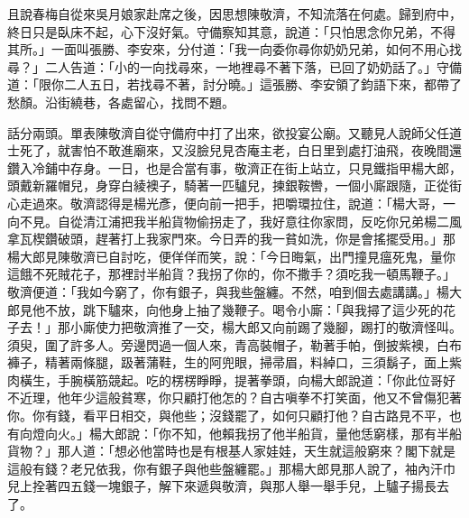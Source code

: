 且說春梅自從來吳月娘家赴席之後，因思想陳敬濟，不知流落在何處。歸到府中，終日只是臥床不起，心下沒好氣。守備察知其意，說道：「只怕思念你兄弟，不得其所。」一面叫張勝、李安來，分付道：「我一向委你尋你奶奶兄弟，如何不用心找尋？」二人告道：「小的一向找尋來，一地裡尋不著下落，已回了奶奶話了。」守備道：「限你二人五日，若找尋不著，討分曉。」這張勝、李安領了鈞語下來，都帶了愁顏。沿街繞巷，各處留心，找問不題。

話分兩頭。單表陳敬濟自從守備府中打了出來，欲投宴公廟。又聽見人說師父任道士死了，就害怕不敢進廟來，又沒臉兒見杏庵主老，白日里到處打油飛，夜晚間還鑽入冷鋪中存身。一日，也是合當有事，敬濟正在街上站立，只見鐵指甲楊大郎，頭戴新羅帽兒，身穿白綾襖子，騎著一匹驢兒，揀銀鞍轡，一個小廝跟隨，正從街心走過來。敬濟認得是楊光彥，便向前一把手，把嚼環拉住，說道：「楊大哥，一向不見。自從清江浦把我半船貨物偷拐走了，我好意往你家問，反吃你兄弟楊二風拿瓦楔鑽破頭，趕著打上我家門來。今日弄的我一貧如洗，你是會搖擺受用。」那楊大郎見陳敬濟已自討吃，便佯佯而笑，說：「今日晦氣，出門撞見瘟死鬼，量你這餓不死賊花子，那裡討半船貨？我拐了你的，你不撒手？須吃我一頓馬鞭子。」敬濟便道：「我如今窮了，你有銀子，與我些盤纏。不然，咱到個去處講講。」楊大郎見他不放，跳下驢來，向他身上抽了幾鞭子。喝令小廝：「與我撏了這少死的花子去！」那小廝使力把敬濟推了一交，楊大郎又向前踢了幾腳，踢打的敬濟怪叫。須臾，圍了許多人。旁邊閃過一個人來，青高裝帽子，勒著手帕，倒披紫襖，白布褲子，精著兩條腿，趿著蒲鞋，生的阿兜眼，掃帚眉，料綽口，三須鬍子，面上紫肉橫生，手腕橫筋競起。吃的楞楞睜睜，提著拳頭，向楊大郎說道：「你此位哥好不近理，他年少這般貧寒，你只顧打他怎的？自古嗔拳不打笑面，他又不曾傷犯著你。你有錢，看平日相交，與他些；沒錢罷了，如何只顧打他？自古路見不平，也有向燈向火。」楊大郎說：「你不知，他賴我拐了他半船貨，量他恁窮樣，那有半船貨物？」那人道：「想必他當時也是有根基人家娃娃，天生就這般窮來？閣下就是這般有錢？老兄依我，你有銀子與他些盤纏罷。」那楊大郎見那人說了，袖內汗巾兒上拴著四五錢一塊銀子，解下來遞與敬濟，與那人舉一舉手兒，上驢子揚長去了。

